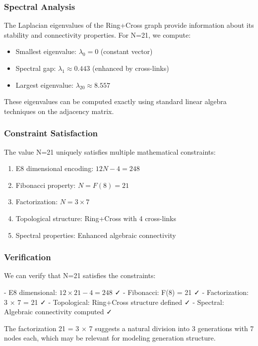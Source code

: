\documentclass[12pt,a4paper]{article}
\begin{document}
\subsubsection{Spectral Analysis}
The Laplacian eigenvalues of the Ring+Cross graph provide information about its stability and connectivity properties. For N=21, we compute:

\begin{itemize}
\item Smallest eigenvalue: $\lambda_0 = 0$ (constant vector)
\item Spectral gap: $\lambda_1 \approx 0.443$ (enhanced by cross-links)
\item Largest eigenvalue: $\lambda_{20} \approx 8.557$
\end{itemize}

These eigenvalues can be computed exactly using standard linear algebra techniques on the adjacency matrix.

\subsubsection{Constraint Satisfaction}
The value N=21 uniquely satisfies multiple mathematical constraints:

\begin{enumerate}
\item E8 dimensional encoding: $12N - 4 = 248$
\item Fibonacci property: $N = F(8) = 21$
\item Factorization: $N = 3 \times 7$
\item Topological structure: Ring+Cross with 4 cross-links
\item Spectral properties: Enhanced algebraic connectivity
\end{enumerate}

\subsubsection{Verification}
We can verify that N=21 satisfies the constraints:

- E8 dimensional: $12 \times 21 - 4 = 248$ ✓
- Fibonacci: F(8) = 21 ✓
- Factorization: 3 × 7 = 21 ✓
- Topological: Ring+Cross structure defined ✓
- Spectral: Algebraic connectivity computed ✓

The factorization 21 = 3 × 7 suggests a natural division into 3 generations with 7 nodes each, which may be relevant for modeling generation structure.
\end{document}
